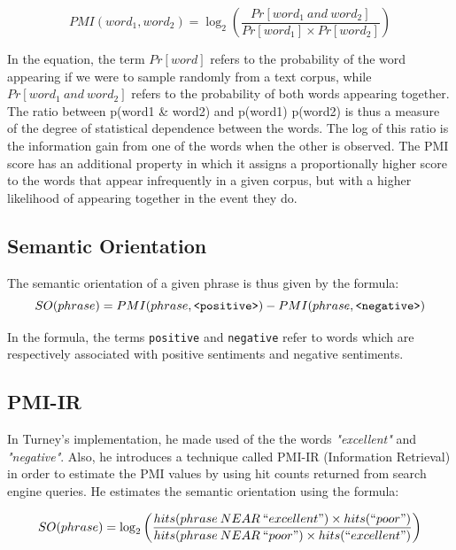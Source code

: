 \documentclass[11pt]{report} %
\begin{document}
\begin{equation*} PMI(word_1, word_2) = \log_2 \left(\frac{Pr[word_1 \: and \: word_2]}{Pr[word_1] \times Pr[word_2]}\right) \end{equation*}

In the equation, the term $Pr[word]$ refers to the probability of the word appearing if we were to sample randomly from a text corpus, while  $Pr[word_1 \: and \: word_2]$ refers to the probability of both words appearing together. The ratio between p(word1 \& word2) and p(word1) p(word2) is thus a measure of the degree of statistical dependence between the words. The log of this ratio is the information gain from one of the words when the other is observed. The PMI score has an additional property in which it assigns a proportionally higher score to the words that appear infrequently in a given corpus, but with a higher likelihood of appearing together in the event they do. \cite{Vargas2010} 

\subsection{Semantic Orientation}
The semantic orientation of a given phrase is thus given by the formula:
\begin{equation*} SO(phrase) = PMI(phrase, \verb|<positive>|) - PMI(phrase, \verb|<negative>|)\end{equation*}

In the formula, the terms \verb|positive| and \verb|negative| refer to words which are respectively associated with positive sentiments and negative sentiments. 

\subsection{PMI-IR}
In Turney's implementation, he made used of the the words \textit{"excellent"} and \textit{"negative"}. Also, he introduces a technique called PMI-IR (Information Retrieval) in order to estimate the PMI values by using hit counts returned from search engine queries. He estimates the semantic orientation using the formula:

\begin{equation*} SO(phrase) = \log_2 \left(\frac{hits(phrase \: NEAR \: ``excellent") \times hits(``poor") }{hits(phrase \: NEAR \: ``poor") \times hits(``excellent") }\right) \end{equation*}
\end{document}
